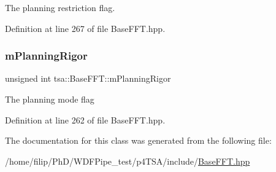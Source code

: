 The planning restriction flag. 

Definition at line 267 of file Base\+F\+F\+T.\+hpp.

\mbox{\label{classtsa_1_1_base_f_f_t_abbd656cda5a7cb6a88fc5d556d3269f7}} 
\subsubsection{\texorpdfstring{m\+Planning\+Rigor}{mPlanningRigor}}
{\footnotesize\ttfamily unsigned int tsa\+::\+Base\+F\+F\+T\+::m\+Planning\+Rigor\hspace{0.3cm}{\ttfamily [protected]}}

The planning mode flag 

Definition at line 262 of file Base\+F\+F\+T.\+hpp.



The documentation for this class was generated from the following file\+:\begin{DoxyCompactItemize}
\item 
/home/filip/\+Ph\+D/\+W\+D\+F\+Pipe\+\_\+test/p4\+T\+S\+A/include/\hyperlink{_base_f_f_t_8hpp}{Base\+F\+F\+T.\+hpp}\end{DoxyCompactItemize}
